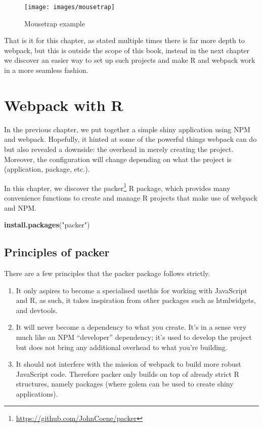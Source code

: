 \documentclass[
  10pt,
]{krantz}
\makeatletter
\newenvironment{Shaded}{\begin{snugshade}}{\end{snugshade}}
\newcommand{\KeywordTok}[1]{\textcolor[rgb]{0.27,0.27,0.27}{\textbf{#1}}}
\newcommand{\NormalTok}[1]{#1}
\newcommand{\StringTok}[1]{\textcolor[rgb]{0.5,0.5,0.5}{#1}}
\providecommand{\tightlist}{%
  \setlength{\itemsep}{0pt}\setlength{\parskip}{0pt}}
\renewcommand{\href}[2]{#2\footnote{\url{#1}}}
\newenvironment{kframe}{%
\medskip{}
\setlength{\fboxsep}{.8em}
 \def\at@end@of@kframe{}%
 \ifinner\ifhmode%
  \def\at@end@of@kframe{\end{minipage}}%
  \begin{minipage}{\columnwidth}%
 \fi\fi%
 \def\FrameCommand##1{\hskip\@totalleftmargin \hskip-\fboxsep
 \colorbox{shadecolor}{##1}\hskip-\fboxsep
     \hskip-\linewidth \hskip-\@totalleftmargin \hskip\columnwidth}%
 \MakeFramed {\advance\hsize-\width
   \@totalleftmargin\z@ \linewidth\hsize
   \@setminipage}}%
 {\par\unskip\endMakeFramed%
 \at@end@of@kframe}
\renewenvironment{Shaded}{\begin{kframe}}{\end{kframe}}
\makeatother
\begin{document}
\begin{figure}[H]

{\centering \texttt{[image: images/mousetrap]} 

}

\caption{Mousetrap example}\label{fig:mousetrap}
\end{figure}

That is it for this chapter, as stated multiple times there is far more depth to webpack, but this is outside the scope of this book, instead in the next chapter we discover an easier way to set up such projects and make R and webpack work in a more seamless fashion.

\hypertarget{packer-overview}{%
\chapter{Webpack with R}\label{packer-overview}}

In the previous chapter, we put together a simple shiny application using NPM and webpack. Hopefully, it hinted at some of the powerful things webpack can do but also revealed a downside: the overhead in merely creating the project. Moreover, the configuration will change depending on what the project is (application, package, etc.).

In this chapter, we discover the \href{https://github.com/JohnCoene/packer}{packer} \citep{R-packer} R package, which provides many convenience functions to create and manage R projects that make use of webpack and NPM.

\begin{Shaded}
\begin{Highlighting}[]
\KeywordTok{install.packages}\NormalTok{(}\StringTok{"packer"}\NormalTok{)}
\end{Highlighting}
\end{Shaded}

\hypertarget{packer-principles}{%
\section{Principles of packer}\label{packer-principles}}

There are a few principles that the packer package follows strictly.

\begin{enumerate}
\def\labelenumi{\arabic{enumi}.}
\tightlist
\item
  It only aspires to become a specialised usethis for working with JavaScript and R, as such, it takes inspiration from other packages such as htmlwidgets, and devtools.
\item
  It will never become a dependency to what you create. It's in a sense very much like an NPM ``developer'' dependency; it's used to develop the project but does not bring any additional overhead to what you're building.
\item
  It should not interfere with the mission of webpack to build more robust JavaScript code. Therefore packer only builds on top of already strict R structures, namely packages (where golem can be used to create shiny applications).
\end{enumerate}
\end{document}
